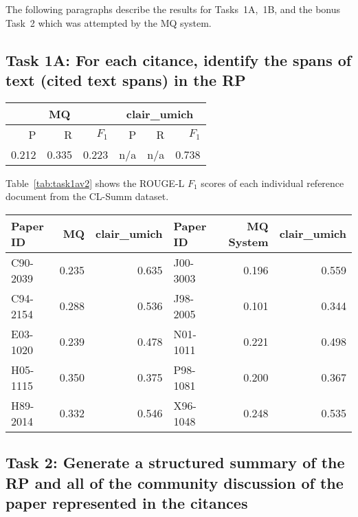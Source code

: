 \documentclass[11pt]{article}
\begin{document}
The following paragraphs describe the results for Tasks~1A,~1B, and the
bonus Task~2 which was attempted by the MQ system.

\subsection{Task 1A: For each citance, identify the spans of text (cited text spans) in the RP}

\begin{table*}
\centering
	\begin{tabular}{|r|r|r|r|r|r|}
	\hline
	\multicolumn{3}{|c|}{MQ} & \multicolumn{3}{|c|}{clair\_umich}\\
	\hline
	P & R & $F_1$ & P & R & $F_1$\\
	\hline
	0.212 & 0.335 & 0.223 & n/a & n/a & 0.738\\
	\hline
	\end{tabular}
\caption{Task~1A performance for the participating systems expressed as ROUGE-L score
 averaged over all topics.}
\label{tab:task1a}
\end{table*}

Table~\ref{tab:task1av2} shows the ROUGE-L $F_1$ scores of each individual 
reference document from the CL-Summ dataset.

\begin{table*}
  \centering
  \begin{tabular}{|l|r|r||l|r|r|}
  	\hline
	Paper ID & MQ  & clair\_umich & Paper ID & MQ System & clair\_umich \\
	\hline
	C90-2039 & 0.235 & 0.635 &	J00-3003 & 0.196 & 0.559\\
	C94-2154 & 0.288 & 0.536 &	J98-2005 & 0.101 & 0.344\\
	E03-1020 & 0.239 & 0.478 &	N01-1011 & 0.221 & 0.498\\
	H05-1115 & 0.350 & 0.375 &	P98-1081 & 0.200 & 0.367\\
	H89-2014 & 0.332 & 0.546 &	X96-1048 & 0.248 & 0.535\\
	\hline
  \end{tabular}
\caption{Task~1A ROUGE-L F1 scores for individual topics.}
\label{tab:task1av2}
\end{table*}

\subsection{Task 2: Generate a structured summary of the RP and all of the community discussion of the paper represented in the citances}
\end{document}
